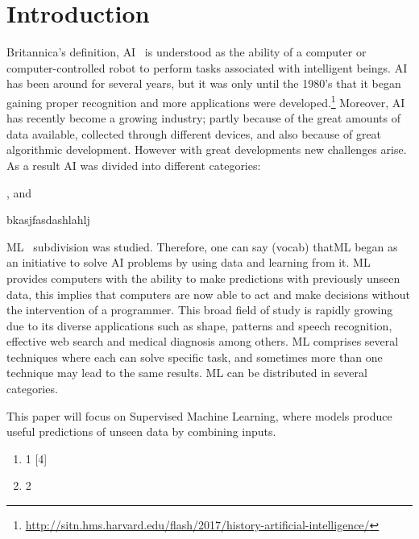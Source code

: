 
\section{Introduction}
\label{sec:introduction}

Britannica's definition, \ac{AI}~\cite{winston84} is understood as the ability of a computer or computer-controlled robot to perform tasks associated with intelligent beings. \ac{AI} has been around for several years, but it was only until the 1980’s that it began gaining proper recognition and more applications were developed.\footnote{\url{http://sitn.hms.harvard.edu/flash/2017/history-artificial-intelligence/}}  Moreover, AI has recently become a growing industry; partly because of the great amounts of data available, collected through different devices, and also because of great algorithmic development. However with great developments new challenges arise. As a result AI was divided into different categories:
\begin{enumerate*}[label=(\arabic*)]
\item {}, and
\item bkasjfasdashlahlj
\end{enumerate*}

\ac{ML}~\cite{watkins92} subdivision was studied. Therefore, one can say (vocab) that\ac{ML} began as an initiative to solve AI problems by using data and learning from it. ML provides computers with the ability to make predictions with previously unseen data, this implies that computers are now able to act and make decisions without the intervention of a programmer. This broad field of study is rapidly growing due to its diverse applications such as shape, patterns and speech recognition, effective web search and medical diagnosis among others. ML comprises several techniques where each can solve specific task, and sometimes more than one technique may lead to the same results. ML can be distributed in several categories.

This paper will focus on Supervised Machine Learning, where models produce useful predictions of unseen data by combining inputs.  


\begin{enumerate}
 \item 1 [4]
 \item 2
\end{enumerate}


